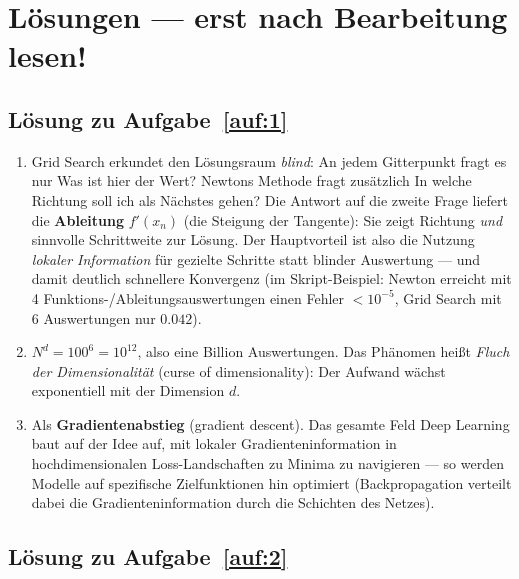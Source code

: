 \documentclass[a4paper,11pt]{scrartcl}
\begin{document}
\schreibraum[10]
\newpage

\section*{Lösungen --- erst nach Bearbeitung lesen!}

\subsection*{Lösung zu Aufgabe~\ref{auf:1}}

\begin{enumerate}[label=(\alph*)]
  \item Grid Search erkundet den Lösungsraum \emph{blind}: An jedem Gitterpunkt fragt es
  nur \glqq Was ist hier der Wert?\grqq{} Newtons Methode fragt zusätzlich
  \glqq In welche Richtung soll ich als Nächstes gehen?\grqq{} Die Antwort auf die zweite
  Frage liefert die \textbf{Ableitung} $f'(x_n)$ (die Steigung der Tangente): Sie zeigt
  Richtung \emph{und} sinnvolle Schrittweite zur Lösung. Der Hauptvorteil ist also die
  Nutzung \emph{lokaler Information} für gezielte Schritte statt blinder Auswertung
  --- und damit deutlich schnellere Konvergenz (im Skript-Beispiel: Newton erreicht mit
  4 Funktions-/Ableitungsauswertungen einen Fehler $< 10^{-5}$, Grid Search mit 6
  Auswertungen nur $0.042$).
  \item $N^d = 100^6 = 10^{12}$, also eine Billion Auswertungen. Das Phänomen heißt
  \emph{Fluch der Dimensionalität} (curse of dimensionality): Der Aufwand wächst
  exponentiell mit der Dimension $d$.
  \item Als \textbf{Gradientenabstieg} (gradient descent). Das gesamte Feld Deep Learning
  baut auf der Idee auf, mit lokaler Gradienteninformation in hochdimensionalen
  Loss-Landschaften zu Minima zu navigieren --- so werden Modelle auf spezifische
  Zielfunktionen hin optimiert (Backpropagation verteilt dabei die
  Gradienteninformation durch die Schichten des Netzes).
\end{enumerate}

\subsection*{Lösung zu Aufgabe~\ref{auf:2}}
\end{document}
